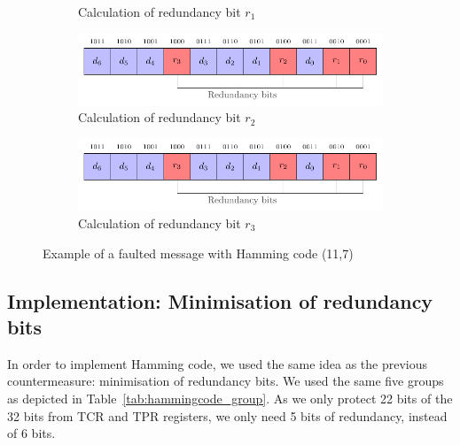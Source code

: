 \begin{figure}[ht]
\begin{subfigure}[b]{0.49\textwidth}
        \caption{Calculation of redundancy bit $r_1$}
        \label{fig:hamming_code_faulted_4}
    \end{subfigure}
    \hfill
    \begin{subfigure}[b]{0.49\textwidth}
        \includegraphics[width=\textwidth, page=15]{c5_countermeasures_dift/img/hamming_bit.pdf}
        \caption{Calculation of redundancy bit $r_2$}
        \label{fig:hamming_code_faulted_5}
    \end{subfigure}
    \hfill
    \begin{subfigure}[b]{0.49\textwidth}
        \includegraphics[width=\textwidth, page=16]{c5_countermeasures_dift/img/hamming_bit.pdf}
        \caption{Calculation of redundancy bit $r_3$}
        \label{fig:hamming_code_faulted_6}
    \end{subfigure}
    \caption{Example of a faulted message with Hamming code (11,7)}
    \label{fig:hamming_code_faulted}
\end{figure}

\subsection{Implementation: Minimisation of redundancy bits}

In order to implement Hamming code, we used the same idea as the previous countermeasure: minimisation of redundancy bits. We used the same five groups as depicted in Table~\ref{tab:hammingcode_group}. As we only protect 22 bits of the 32 bits from TCR and TPR registers, we only need 5 bits of redundancy, instead of 6 bits.

